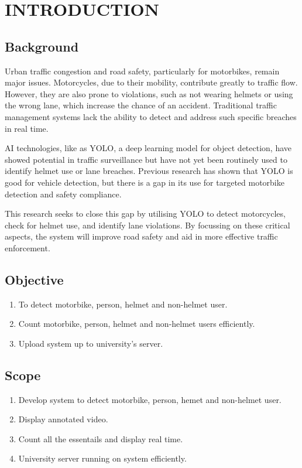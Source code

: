 \chapter{INTRODUCTION}

\section{Background}
Urban traffic congestion and road safety, particularly for motorbikes, remain major issues. Motorcycles, due to their mobility, contribute greatly to traffic flow. However, they are also prone to violations, such as not wearing helmets or using the wrong lane, which increase the chance of an accident. Traditional traffic management systems lack the ability to detect and address such specific breaches in real time.

AI technologies, like as YOLO, a deep learning model for object detection, have showed potential in traffic surveillance but have not yet been routinely used to identify helmet use or lane breaches. Previous research has shown that YOLO is good for vehicle detection, but there is a gap in its use for targeted motorbike detection and safety compliance.

This research seeks to close this gap by utilising YOLO to detect motorcycles, check for helmet use, and identify lane violations. By focussing on these critical aspects, the system will improve road safety and aid in more effective traffic enforcement.

\section{Objective}
\begin{enumerate}
	\item To detect motorbike, person, helmet and non-helmet user.
	\item Count motorbike, person, helmet and non-helmet users efficiently.
	\item Upload system up to university's server.
\end{enumerate}

\section{Scope}
\begin{enumerate}
    \item Develop system to detect motorbike, person, hemet and non-helmet user.
    \item Display annotated video.
    \item  Count all the essentails and display real time.
    \item University server running on system efficiently.
 

\end{enumerate}

